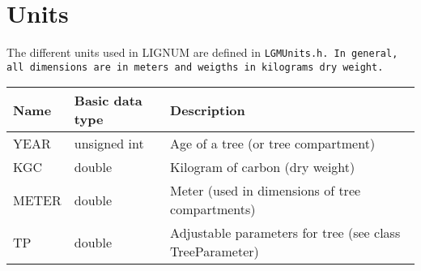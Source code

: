 
\chapter{Units}

The different units used in LIGNUM are defined in \tt LGMUnits.h\rm. 
In general, all dimensions are in meters and weigths in
kilograms dry weight. \linebreak

\begin{tabular}{|l|l|p{5.0cm}|} \hline
Name & Basic data type & Description \\ \hline
YEAR & unsigned int & Age of a tree (or tree compartment) \\ \hline
KGC  & double       & Kilogram of carbon (dry weight)  \\ \hline
METER & double       & Meter (used in dimensions of tree compartments) \\ \hline
TP   & double       & Adjustable parameters for tree (see class
TreeParameter) \\ \hline
\end{tabular}
